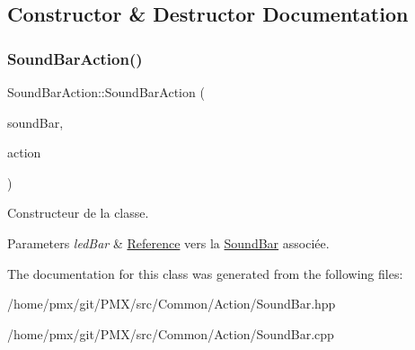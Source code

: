 \subsection{Constructor \& Destructor Documentation}
\mbox{\label{classSoundBarAction_ab41056739f81ce59ff1eb834901c7ac8}} 
\subsubsection{\texorpdfstring{Sound\+Bar\+Action()}{SoundBarAction()}}
{\footnotesize\ttfamily Sound\+Bar\+Action\+::\+Sound\+Bar\+Action (\begin{DoxyParamCaption}\item[{\hyperlink{classSoundBar}{Sound\+Bar} \&}]{sound\+Bar,  }\item[{Sound\+Bar\+Action\+Name}]{action }\end{DoxyParamCaption})}



Constructeur de la classe. 


\begin{DoxyParams}{Parameters}
{\em led\+Bar} & \hyperlink{structReference}{Reference} vers la \hyperlink{classSoundBar}{Sound\+Bar} associée. \\
\hline
\end{DoxyParams}


The documentation for this class was generated from the following files\+:\begin{DoxyCompactItemize}
\item 
/home/pmx/git/\+P\+M\+X/src/\+Common/\+Action/Sound\+Bar.\+hpp\item 
/home/pmx/git/\+P\+M\+X/src/\+Common/\+Action/Sound\+Bar.\+cpp\end{DoxyCompactItemize}
